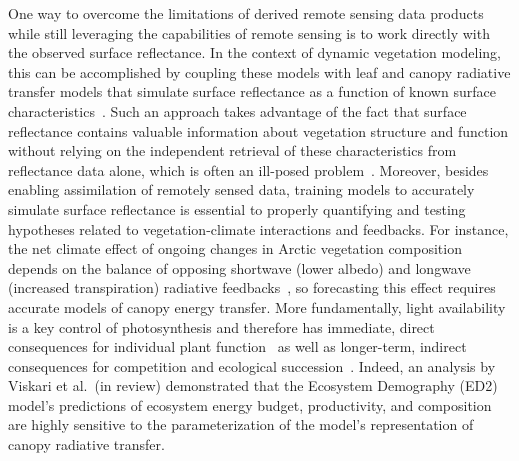 One way to overcome the limitations of derived remote sensing data products while still leveraging the capabilities of remote sensing is to work directly with the observed surface reflectance.
In the context of dynamic vegetation modeling, this can be accomplished by coupling these models with leaf and canopy radiative transfer models that simulate surface reflectance as a function of known surface characteristics~\cite{quaife_2008_assimilating}.
% 
% 
Such an approach takes advantage of the fact that surface reflectance contains valuable information about vegetation structure and function without relying on the independent retrieval of these characteristics from reflectance data alone, which is often an ill-posed problem~\cite{combal_2003_retrieval,lewis_2007_spectral}.
Moreover, besides enabling assimilation of remotely sensed data, training models to accurately simulate surface reflectance is essential to properly quantifying and testing hypotheses related to vegetation-climate interactions and feedbacks.
For instance, the net climate effect of ongoing changes in Arctic vegetation composition depends on the balance of opposing shortwave (lower albedo) and longwave (increased transpiration) radiative feedbacks~\cite{Swann_2010_changes}, so forecasting this effect requires accurate models of canopy energy transfer.
% 
% 
More fundamentally, light availability is a key control of photosynthesis and therefore has
immediate, direct consequences for individual plant function~\cite{hikosaka_1995_model,robakowski_2004_growth,Niinemets_2016_within,Keenan_2016_global}
as well as longer-term, indirect consequences for competition and ecological succession~\cite{Niinemets_2006_tolerance,Kitajima_2013_leaf,Falster_2017_multitrait}.
Indeed, an analysis by Viskari et al.\ (in review) \nocite{Viskari_inreview_ED} demonstrated that the Ecosystem Demography (ED2) model's predictions of ecosystem energy budget, productivity, and composition are highly sensitive to the parameterization of the model's representation of canopy radiative transfer.
% 
% 
% 

